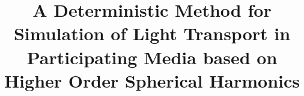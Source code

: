 

\title[Draft]%
{
A Deterministic Method for Simulation of Light Transport in Participating Media based on Higher Order Spherical Harmonics
}




%




